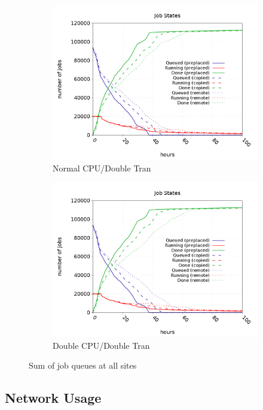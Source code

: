 \documentclass[a4paper]{jpconf}
\begin{document}
\begin{figure}
\begin{subfigure}{0.3\textwidth}
    \includegraphics[width=\textwidth]{figures/FP1_RP0CPU.png}
    \caption{Normal CPU/Double Tran}
  \end{subfigure}
  \begin{subfigure}{0.3\textwidth}
    \includegraphics[width=\textwidth]{figures/FP1_RP1CPU.png}
    \caption{Double CPU/Double Tran}
  \end{subfigure}
  \caption{Sum of job queues at all sites\label{fig:jobQueues}}
\end{figure}

\subsection{Network Usage}
\end{document}
